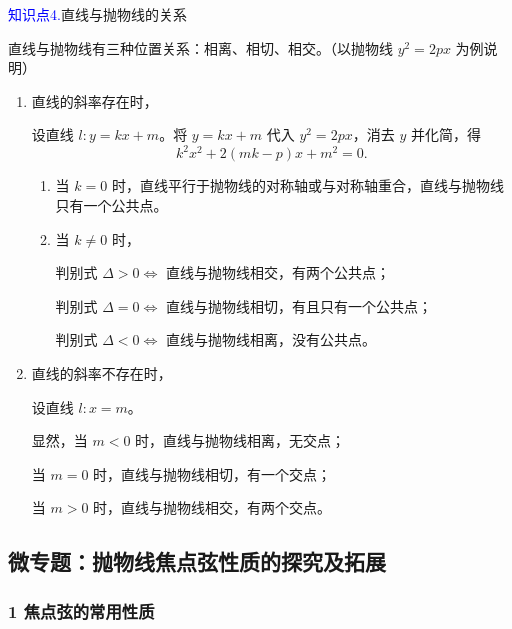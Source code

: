 \documentclass{article}
\begin{document}
 \vspace{1\baselineskip}

\textcolor{blue}{知识点4.}直线与抛物线的关系
 \vspace{1\baselineskip}

直线与抛物线有三种位置关系：相离、相切、相交。（以抛物线 $y^2 = 2px$ 为例说明）

\begin{enumerate}[label=(\arabic*)]
    \item 直线的斜率存在时，

    设直线 $l:y = kx + m$。将 $y = kx + m$ 代入 $y^2 = 2px$，消去 $y$ 并化简，得
    $$k^2x^2 + 2(mk - p)x + m^2 = 0.$$

    \begin{enumerate}
        \item 当 $k = 0$ 时，直线平行于抛物线的对称轴或与对称轴重合，直线与抛物线只有一个公共点。
        \item 当 $k \neq 0$ 时，

        判别式 $\Delta > 0 \Leftrightarrow$ 直线与抛物线相交，有两个公共点；

        判别式 $\Delta = 0 \Leftrightarrow$ 直线与抛物线相切，有且只有一个公共点；

        判别式 $\Delta < 0 \Leftrightarrow$ 直线与抛物线相离，没有公共点。
    \end{enumerate}

    \item 直线的斜率不存在时，

    设直线 $l:x = m$。

    显然，当 $m < 0$ 时，直线与抛物线相离，无交点；

    当 $m = 0$ 时，直线与抛物线相切，有一个交点；

    当 $m > 0$ 时，直线与抛物线相交，有两个交点。
\end{enumerate}
 \vspace{2\baselineskip}

\begin{center}
\subsection*{微专题：抛物线焦点弦性质的探究及拓展}
\end{center}

\subsubsection*{1 焦点弦的常用性质}
\end{document}
